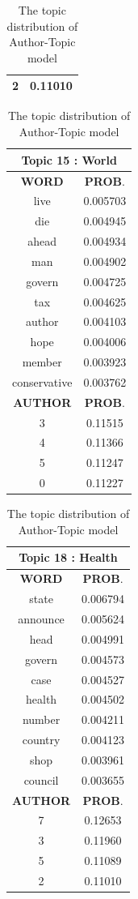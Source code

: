 \begin{table}[h!]
\begin{tabular}{|c c|}
2 &   0.11010  \\
 \hline
 \end{tabular} 
\hfill
 \begin{tabular}{|c c|} 
\hline
\multicolumn{2}{|c|}{\textbf{Topic 15 : World}} \\
\hline
 \textbf{WORD} & \textbf{PROB}.  \\ [0.3ex] 
 \hline
 live  & 0.005703\\ 
	die   &  0.004945\\ 
	ahead  &   0.004934\\ 
	man   &  0.004902\\ 
	govern  &   0.004725\\ 
	tax   &  0.004625\\ 
	author  &   0.004103\\ 
	hope   &  0.004006\\ 
	member  &   0.003923\\ 
	conservative  &   0.003762\\ [1ex] 
 \hline
  \textbf{AUTHOR} & \textbf{PROB}.  \\ [0.3ex] 
 \hline
 3 &   0.11515 \\
4  &    0.11366 \\
5   &   0.11247 \\
0  &    0.11227  \\
 \hline
 \end{tabular} 
\hfill
\begin{tabular}{|c c|} 
\hline
\multicolumn{2}{|c|}{\textbf{Topic 18 : Health}} \\
\hline
 \textbf{WORD} & \textbf{PROB}.  \\ [0.3ex] 
 \hline
 state &  0.006794 \\ 
	announce  &   0.005624 \\ 
	head  &   0.004991 \\ 
	govern &    0.004573 \\ 
	case &    0.004527 \\ 
	health &    0.004502 \\ 
	number &    0.004211 \\ 
	country&    0.004123 \\ 
	shop  &   0.003961 \\ 
	council &  0.003655 \\ [1ex] 
 \hline
  \textbf{AUTHOR} & \textbf{PROB}.  \\ [0.3ex] 
 \hline
 7 &  0.12653 \\
3 &   0.11960 \\
5 &   0.11089 \\
2 &   0.11010  \\
 \hline
 \end{tabular} 
\hfill
\caption{The topic distribution of Author-Topic model}
\label{table:at_topic_distribution}
\end{table}

